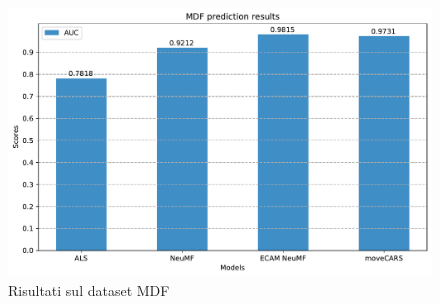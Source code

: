 \documentclass[12pt,italian]{report}
\begin{document}
%

\begin{figure}
  \centering
  \includegraphics[width=\linewidth]{immagini/mdf_test_results.pdf}
  \caption{Risultati sul dataset MDF}
  \label{fig:result-mdf}
\end{figure}
\end{document}
